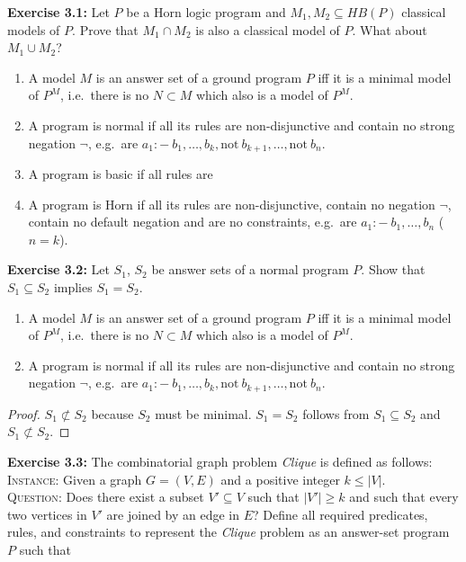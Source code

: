 \documentclass[11pt,a4paper]{article}
\theoremstyle{remark}
\newcommand{\exercise}[1]{{\bfseries{Exercise #1:}}}
\begin{document}
\newpage

\exercise{3.1} Let $P$ be a Horn logic program and $M_1, M_2 \subseteq \textit{HB}(P)$ classical models of $P$. Prove that $M_1 \cap M_2$ is also a classical model of $P$. What about $M_1 \cup M_2$?

\begin{enumerate}
	\item A model $M$ is an answer set of a ground program $P$ iff it is a minimal model of $P^M$, i.e.~there is no $N \subset M$ which also is a model of $P^M$.
    \item A program is normal if all its rules are non-disjunctive and contain no strong negation $\neg$, e.g.~are $a_1 :- \ b_1, \ldots, b_k, \text{not} \ b_{k+1}, \ldots, \text{not}  \ b_n$.
    \item A program is basic if all rules are 
	\item A program is Horn if all its rules are non-disjunctive, contain no negation $\neg$, contain no default negation and are no constraints, e.g.~are $a_1 :- \ b_1, \ldots, b_n$ ($n = k$).
\end{enumerate}

\exercise{3.2} Let $S_1$, $S_2$ be answer sets of a normal program $P$. Show that $S_1 \subseteq S_2$ implies $S_1 = S_2$.

\begin{enumerate}
	\item A model $M$ is an answer set of a ground program $P$ iff it is a minimal model of $P^M$, i.e.~there is no $N \subset M$ which also is a model of $P^M$.
	\item A program is normal if all its rules are non-disjunctive and contain no strong negation $\neg$, e.g.~are $a_1 :- \ b_1, \ldots, b_k, \text{not} \ b_{k+1}, \ldots, \text{not}  \ b_n$.
\end{enumerate}

\begin{proof}$S_1 \not \subset S_2$ because $S_2$ must be minimal. $S_1 = S_2$ follows from $S_1 \subseteq S_2$ and $S_1 \not \subset S_2$.
\end{proof}

\exercise{3.3} The combinatorial graph problem \emph{Clique} is defined as follows:\\
\textsc{Instance}: Given a graph $G = (V, E)$ and a positive integer $k \leq |V|$.\\
\textsc{Question}: Does there exist a subset $V' \subseteq V$ such that $|V'| \geq k$ and such that every two vertices in $V'$ are joined by an edge in $E$?
Define all required predicates, rules, and constraints to represent the \emph{Clique} problem as an answer-set program $P$ such that
\end{document}
